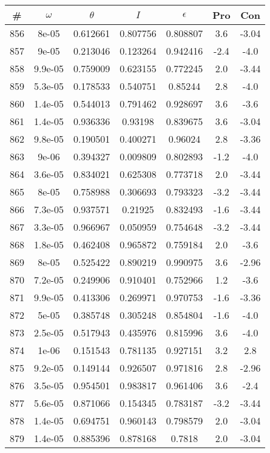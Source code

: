 \begin{table}
\begin{tabular}{c|c|c|c|c|c|c}
\# & $\omega$ & $\theta$ & $I$ & $\epsilon$ & Pro & Con\\
\hline
856 & 8e-05 & 0.612661 & 0.807756 & 0.808807 & 3.6 & -3.04\\
857 & 9e-05 & 0.213046 & 0.123264 & 0.942416 & -2.4 & -4.0\\
858 & 9.9e-05 & 0.759009 & 0.623155 & 0.772245 & 2.0 & -3.44\\
859 & 5.3e-05 & 0.178533 & 0.540751 & 0.85244 & 2.8 & -4.0\\
860 & 1.4e-05 & 0.544013 & 0.791462 & 0.928697 & 3.6 & -3.6\\
861 & 1.4e-05 & 0.936336 & 0.93198 & 0.839675 & 3.6 & -3.04\\
862 & 9.8e-05 & 0.190501 & 0.400271 & 0.96024 & 2.8 & -3.36\\
863 & 9e-06 & 0.394327 & 0.009809 & 0.802893 & -1.2 & -4.0\\
864 & 3.6e-05 & 0.834021 & 0.625308 & 0.773718 & 2.0 & -3.44\\
865 & 8e-05 & 0.758988 & 0.306693 & 0.793323 & -3.2 & -3.44\\
866 & 7.3e-05 & 0.937571 & 0.21925 & 0.832493 & -1.6 & -3.44\\
867 & 3.3e-05 & 0.966967 & 0.050959 & 0.754648 & -3.2 & -3.44\\
868 & 1.8e-05 & 0.462408 & 0.965872 & 0.759184 & 2.0 & -3.6\\
869 & 8e-05 & 0.525422 & 0.890219 & 0.990975 & 3.6 & -2.96\\
870 & 7.2e-05 & 0.249906 & 0.910401 & 0.752966 & 1.2 & -3.6\\
871 & 9.9e-05 & 0.413306 & 0.269971 & 0.970753 & -1.6 & -3.36\\
872 & 5e-05 & 0.385748 & 0.305248 & 0.854804 & -1.6 & -4.0\\
873 & 2.5e-05 & 0.517943 & 0.435976 & 0.815996 & 3.6 & -4.0\\
874 & 1e-06 & 0.151543 & 0.781135 & 0.927151 & 3.2 & 2.8\\
875 & 9.2e-05 & 0.149144 & 0.926507 & 0.971816 & 2.8 & -2.96\\
876 & 3.5e-05 & 0.954501 & 0.983817 & 0.961406 & 3.6 & -2.4\\
877 & 5.6e-05 & 0.871066 & 0.154345 & 0.783187 & -3.2 & -3.44\\
878 & 1.4e-05 & 0.694751 & 0.960143 & 0.798579 & 2.0 & -3.04\\
879 & 1.4e-05 & 0.885396 & 0.878168 & 0.7818 & 2.0 & -3.04\\

\end{tabular}
\end{table}
